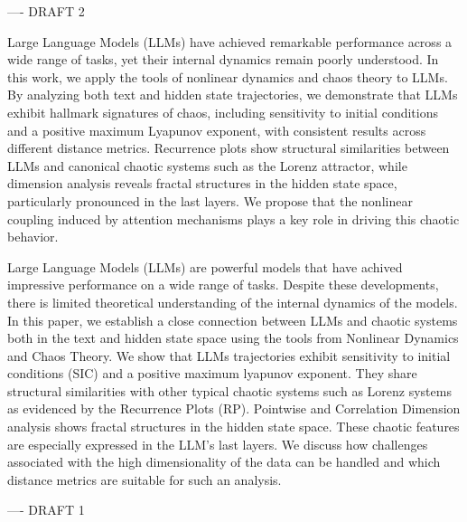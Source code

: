 ---- DRAFT 2

Large Language Models (LLMs) have achieved remarkable performance across a wide range of tasks, yet their internal dynamics remain poorly understood. In this work, we apply the tools of nonlinear dynamics and chaos theory to LLMs. By analyzing both text and hidden state trajectories, we demonstrate that LLMs exhibit hallmark signatures of chaos, including sensitivity to initial conditions and a positive maximum Lyapunov exponent, with consistent results across different distance metrics. Recurrence plots show structural similarities between LLMs and canonical chaotic systems such as the Lorenz attractor, while dimension analysis reveals fractal structures in the hidden state space, particularly pronounced in the last layers. We propose that the nonlinear coupling induced by attention mechanisms plays a key role in driving this chaotic behavior. 





Large Language Models (LLMs) are powerful models that have achived impressive performance on a wide range of tasks. Despite these developments, there is limited theoretical understanding of the internal dynamics of the models. In this paper, we establish a close connection between LLMs and chaotic systems both in the text and hidden state space using the tools from Nonlinear Dynamics and Chaos Theory. We show that LLMs trajectories exhibit sensitivity to initial conditions (SIC) and a positive maximum lyapunov exponent. They share structural similarities with other typical chaotic systems such as Lorenz systems as evidenced by the Recurrence Plots (RP). Pointwise and Correlation Dimension analysis shows fractal structures in the hidden state space. These chaotic features are especially expressed in the LLM's last layers. We discuss how challenges associated with the high dimensionality of the data can be handled and which distance metrics are suitable for such an analysis.




---- DRAFT 1


